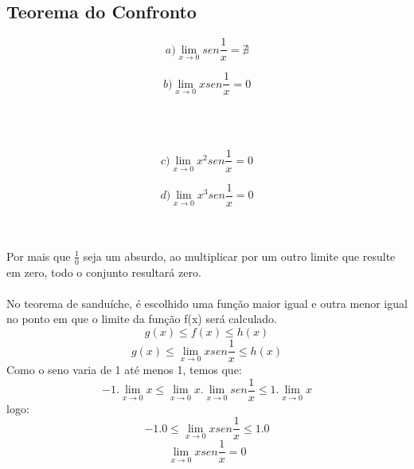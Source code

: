\documentclass{article}
\begin{document}
		\subsection{Teorema do Confronto}
			\begin{minipage}{5 cm}
				 \[ a) \lim_{x\to 0} sen \frac{1}{x} = \nexists \]
			\end{minipage}
			\begin{minipage}{5 cm}
				\[ b) \lim_{x\to 0} xsen \frac{1}{x} = 0\]
			\end{minipage}
			\\ \\
			\begin{minipage}{5 cm}
				\[ c) \lim_{x\to 0} x^2sen \frac{1}{x} = 0\]
			\end{minipage}
			\begin{minipage}{5 cm}
				\[ d) \lim_{x\to 0} x^3sen \frac{1}{x} = 0 \]
			\end{minipage}
			\\ \\
			Por mais que $\frac{1}{0}$ seja um absurdo, ao multiplicar por um outro limite que resulte em zero, todo o conjunto resultará zero.
			\\ \\
			No teorema de sanduíche, é escolhido uma função maior igual e outra menor igual no ponto em que o limite da função f(x) será calculado.
			\[ g(x) \leq f(x) \leq h(x)\]
			\[ g(x) \leq \lim_{x\to 0}xsen \frac{1}{x} \leq h(x)\]
			Como o seno varia de 1 até menos 1, temos que:
			\[ -1. \lim_{x\to 0}x \leq \lim_{x\to 0}x . \lim_{x\to 0}sen \frac{1}{x} \leq 1.\lim_{x\to 0}x \]
			logo:
			\[ -1.0 \leq \lim_{x\to 0}xsen \frac{1}{x} \leq 1.0 \]
			\[ \lim_{x\to 0}xsen \frac{1}{x} = 0\]
			
\end{document}
